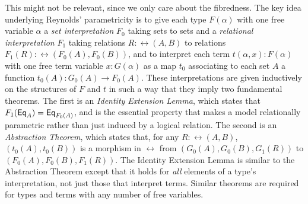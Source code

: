 \documentclass[acmsmall,screen,review,anonymous]{acmart}
\theoremstyle{definition}
\begin{document}
{\color{red} This might not be relevant, since we only care about the
  fibredness.} 
The key idea underlying Reynolds' parametricity is to give each type
$F(\alpha)$ with one free variable $\alpha$ a {\em set interpretation}
$F_0$ taking sets to sets and a \emph{relational interpretation} $F_1$
taking relations $R : \rel(A,B)$ to relations $F_1 (R) : \rel(F_0 (A),
F_0 (B))$, and to interpret each term $t(\alpha,x) : F(\alpha)$ with
one free term variable $x : G(\alpha)$ as a map $t_0$ associating to
each set $A$ a function $t_0(A) : G_0(A) \to F_0(A)$. These
interpretations are given inductively on the structures of $F$ and $t$
in such a way that they imply two fundamental theorems. The first is
an \emph{Identity Extension Lemma}, which states that $F_1(\mathsf{Eq}_A) =
\mathsf{Eq}_{F_0(A)}$, and is the essential property that makes a model
relationally parametric rather than just induced by a logical
relation. The second is an \emph{Abstraction Theorem}, which states
that, for any $R :\rel(A, B)$, $(t_0(A),t_0(B))$ is a morphism in
$\rel$ from $(G_0(A),G_0(B),G_1(R))$ to $(F_0(A),F_0(B),F_1(R))$. The
Identity Extension Lemma is similar to the Abstraction Theorem except
that it holds for {\em all} elements of a type's interpretation, not
just those that interpret terms.  Similar theorems are required for
types and terms with any number of free variables.
\end{document}
